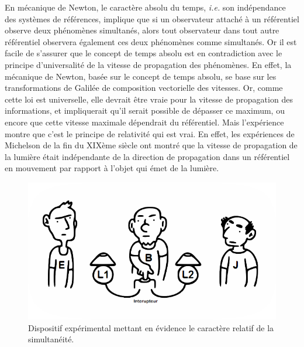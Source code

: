 		En mécanique de Newton, le caractère absolu du temps, \emph{i.e.} son indépendance des systèmes de références, implique que si un observateur attaché à un référentiel observe deux phénomènes simultanés, alors tout observateur dans tout autre référentiel observera également ces deux phénomènes comme simultanés. Or il est facile de s'assurer que le concept de temps absolu est en contradiction avec le principe d'universalité de la vitesse de propagation des phénomènes. En effet, la mécanique de Newton, basée sur le concept de temps absolu, se base sur les transformations de Galilée de composition vectorielle des vitesses. Or, comme cette loi est universelle, elle devrait être vraie pour la vitesse de propagation des informations, et impliquerait qu'il serait possible de dépasser ce maximum, ou encore que cette vitesse maximale dépendrait du référentiel. Mais l'expérience montre que c'est le principe de relativité qui est vrai. En effet, les expériences de Michelson de la fin du XIXème siècle ont montré que la vitesse de propagation de la lumière était indépendante de la direction de propagation dans un référentiel en mouvement par rapport à l'objet qui émet de la lumière. 

		\begin{figure}
			\centering
			\includegraphics[scale=0.4]{../cours/imgpsh_fullsize.png}
			\caption{Dispositif expérimental mettant en évidence le caractère relatif de la simultanéité.}
			\label{pluthaar}
		\end{figure}

